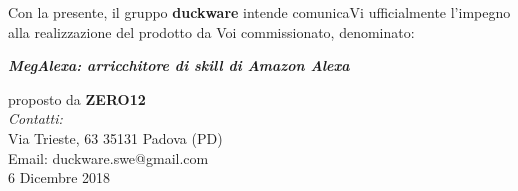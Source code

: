 \begin{flushleft}
	Con la presente, il gruppo \textbf{duckware} intende comunicaVi ufficialmente l’impegno alla realizzazione del prodotto da Voi commissionato, denominato: \\ [0.8cm]
\end{flushleft}
\begin{center}
{\large \textit{\textbf{MegAlexa: arricchitore di skill di Amazon Alexa}}}\\ [0.8cm]
\end{center}
\begin{flushleft}
	proposto da \textbf{ZERO12}\\ [2.0cm]
	
	\textit{Contatti:}\\
	Via Trieste, 63 35131 Padova (PD) \\
	Email: duckware.swe@gmail.com \\
	6 Dicembre 2018
\end{flushleft}